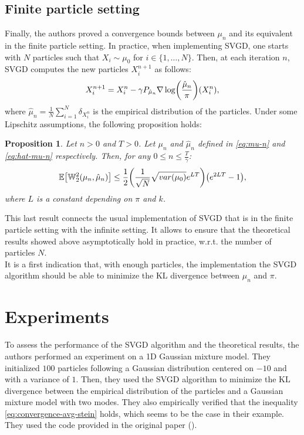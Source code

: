 \documentclass{article}
\newcommand{\E}{\mathbb{E}}
\newcommand{\KL}{\mathrm{KL}}
\newcommand{\W}{\mathbb{W}}
\DeclarePairedDelimiter{\pare}{(}{)}
\DeclarePairedDelimiter{\sq}{[}{]}
\newtheorem{proposition}{Proposition}
\begin{document}
\subsection{Finite particle setting}
Finally, the authors proved a convergence bounds between
$\mu_n$ and its equivalent in the finite particle setting.
In practice, when implementing SVGD, one starts with $N$ particles
such that $X_i \sim \mu_0$ for $i \in \{1, \ldots, N\}$.
Then, at each iteration $n$, SVGD computes the new particles $X_i^{n+1}$
as follows:
\begin{equation}
X_i^{n+1} = X_i^n - \gamma P_{\hat{\mu}_n} \nabla \log \pare*{ \frac{\hat{\mu}_n}{\pi} }(X_i^n),
\label{eq:hat-mu-n}
\end{equation}
where $\hat{\mu}_n = \frac{1}{N} \sum_{i=1}^N \delta_{X_i^n} $ is the empirical distribution
of the particles. Under some Lipschitz assumptions, the following proposition holds:
\begin{proposition}
  Let $n > 0$ and $T > 0$. Let $\mu_n$ and $\hat{\mu}_n$ defined in \eqref{eq:mu-n} and
  \eqref{eq:hat-mu-n} respectively. Then, for any $0 \leq n \leq \frac{T}{\gamma}$:
  \begin{equation}
    \E\sq*{ \W_2^2(\mu_n, \hat{\mu}_n) } \leq \frac{1}{2}
      \pare*{ \frac{1}{\sqrt{N}} \sqrt{var(\mu_0)} e^{LT} } \pare*{e^{2LT} - 1},
    \label{eq:W2-bounds}
  \end{equation}
  where $L$ is a constant depending on $\pi$ and $k$.
\end{proposition}
This last result connects the usual implementation of SVGD
that is in the finite particle setting with the infinite setting.
It allows to ensure that
the theoretical results showed above asymptotically hold in practice,
w.r.t. the number of particles $N$.\\
It is a first indication that, with enough particles, the implementation the SVGD algorithm
should be able to minimize the $\KL$ divergence between $\mu_n$ and $\pi$.


\section{Experiments}
To assess the performance of the SVGD algorithm and the theoretical results,
the authors performed an experiment on a 1D Gaussian mixture model.
They initialized $100$ particles following a Gaussian distribution
centered on $-10$ and with a variance of $1$.
Then, they used the SVGD algorithm to minimize the $\KL$ divergence
between the empirical distribution of the particles and
a Gaussian mixture model with two modes.
They also empirically verified that the inequality \eqref{eq:convergence-avg-stein}
holds, which seems to be the case in their example.
They used the code provided in the original paper (\cite{Original-SVGD}).\\
\end{document}
